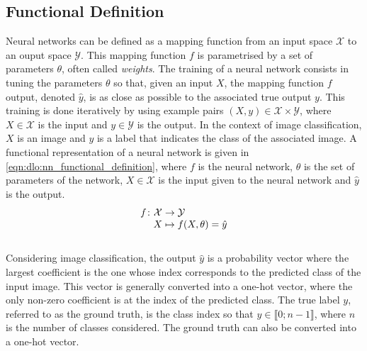 \subsection{Functional Definition}

Neural networks can be defined as a mapping function from an input space
$\mathcal{X}$ to an ouput space $\mathcal{Y}$. This mapping function $f$ is
parametrised by a set of parameters $\theta$, often called \emph{weights}. The
training of a neural network consists in tuning the parameters $\theta$ so that,
given an input $X$, the mapping function $f$ output, denoted $\hat{y}$, is as
close as possible to the associated true output $y$. This training is done
iteratively by using example pairs $(X, y) \in \mathcal{X} \times \mathcal{Y}$,
where $X\in\mathcal{X}$ is the input and $y\in\mathcal{Y}$ is the output. In the
context of image classification, $X$ is an image and $y$ is a label that
indicates the class of the associated image. A functional representation of a
neural network is given in \cref{eqn:dlo:nn_functional_definition}, where $f$ is
the neural network, $\theta$ is the set of parameters of the network,
$X\in\mathcal{X}$ is the input given to the neural network and $\hat{y}$ is the
output.\\

\begin{equation}
  \label{eqn:dlo:nn_functional_definition}
  \begingroup
  \setlength\arraycolsep{0pt}
  f \colon\begin{array}[t]{c >{{}}c<{{}} l}
    \mathcal{X} & \to     & \mathcal{Y} \\
    X                     & \mapsto & f(X, \theta) = \hat{y}
  \end{array}
  \endgroup
\end{equation}\\


Considering image classification,  the output $\hat{y}$ is a probability vector
where the largest coefficient is the one whose index corresponds to the
predicted class of the input image. This vector is generally converted into a
one-hot vector, where the only non-zero coefficient is at the index of the
predicted class. The true label $y$, referred to as the ground truth, is the
class index so that $y\in\llbracket0;n-1\rrbracket$, where $n$ is the number of
classes considered. The ground truth can also be converted into a one-hot
vector.\\


